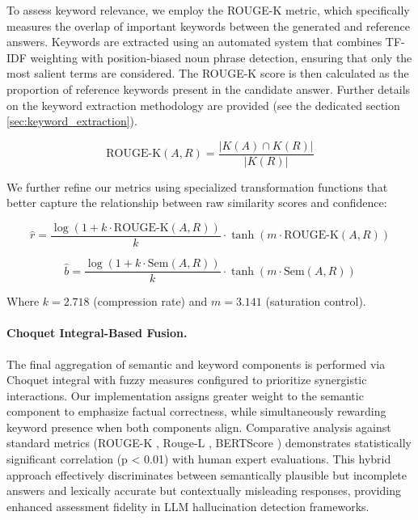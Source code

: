 \documentclass[sigconf]{acmart}
\begin{document}
To assess keyword relevance, we employ the ROUGE-K \cite{rouge_k} metric, which specifically measures the overlap of important keywords between the generated and reference answers. Keywords are extracted using an automated system that combines TF-IDF weighting with position-biased noun phrase detection, ensuring that only the most salient terms are considered. The ROUGE-K score is then calculated as the proportion of reference keywords present in the candidate answer. Further details on the keyword extraction methodology are provided (see the dedicated section \ref{sec:keyword_extraction}).

\begin{equation}
    \text{ROUGE-K}(A, R) = \frac{|K(A) \cap K(R)|}{|K(R)|}
\end{equation}

We further refine our metrics using specialized transformation functions that better capture the relationship between raw similarity scores and confidence:

\begin{equation}
\hat{r} = \frac{\log(1 + k \cdot \text{ROUGE-K}(A, R))}{k} \cdot \tanh(m \cdot \text{ROUGE-K}(A, R))
\end{equation}

\begin{equation}
\hat{b} = \frac{\log(1 + k \cdot \text{Sem}(A, R))}{k} \cdot \tanh(m \cdot \text{Sem}(A, R))
\end{equation}

Where $k=2.718$ (compression rate) and $m=3.141$ (saturation control).

\paragraph{Choquet Integral-Based Fusion.}
The final aggregation of semantic and keyword components is performed via Choquet integral \cite{choquet1953capacities} with fuzzy measures configured to prioritize synergistic interactions. Our implementation assigns greater weight to the semantic component to emphasize factual correctness, while simultaneously rewarding keyword presence when both components align. Comparative analysis against standard metrics (ROUGE-K \cite{rouge_k}, Rouge-L \cite{rouge_l}, BERTScore \cite{bertscore}) demonstrates statistically significant correlation (p < 0.01) with human expert evaluations. This hybrid approach effectively discriminates between semantically plausible but incomplete answers and lexically accurate but contextually misleading responses, providing enhanced assessment fidelity in LLM hallucination detection frameworks.
\end{document}
